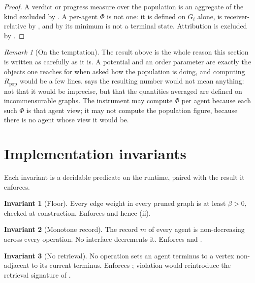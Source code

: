 \documentclass[11pt,a4paper]{article}
\theoremstyle{clstyle}
\theoremstyle{definition}
\newtheorem{binv}{Invariant}
\theoremstyle{remark}
\newtheorem{remark}[theorem]{Remark}
\newcommand{\flo}{\beta}
\newcommand{\rec}{m}
\newcommand{\Ord}{R}
\newcommand{\Pot}{\Phi}
\begin{document}
\begin{proof}
A verdict or progress measure over the population is an aggregate of the
kind excluded by . A per-agent $\Pot$ is not one: it is
defined on $G_i$ alone, is receiver-relative by
, and by  its minimum is not a
terminal state. Attribution is excluded by .
\end{proof}

\begin{remark}[On the temptation]
\label{rem:temptation}
The result above is the whole reason this section is written as carefully as
it is. A potential and an order parameter are exactly the objects one
reaches for when asked how the population is doing, and computing
$\Ord_{\mathrm{pop}}$ would be a few lines.  says the
resulting number would not mean anything: not that it would be imprecise,
but that the quantities averaged are defined on incommensurable graphs.
The instrument may compute $\Pot$ per agent because each such $\Pot$ is that
agent view; it may not compute the population figure, because there is no
agent whose view it would be.
\end{remark}

\section{Implementation invariants}
\label{sec:invariants}

Each invariant is a decidable predicate on the runtime, paired with the
result it enforces.

\begin{binv}[Floor]
\label{binv:floor}
Every edge weight in every pruned graph is at least $\flo>0$, checked at
construction. Enforces  and hence
(ii).
\end{binv}

\begin{binv}[Monotone record]
\label{binv:record}
The record $\rec$ of every agent is non-decreasing across every operation.
No interface decrements it. Enforces  and
.
\end{binv}

\begin{binv}[No retrieval]
\label{binv:noretrieval}
No operation sets an agent terminus to a vertex non-adjacent to its current
terminus. Enforces ; violation would reintroduce the
retrieval signature of .
\end{binv}
\end{document}
